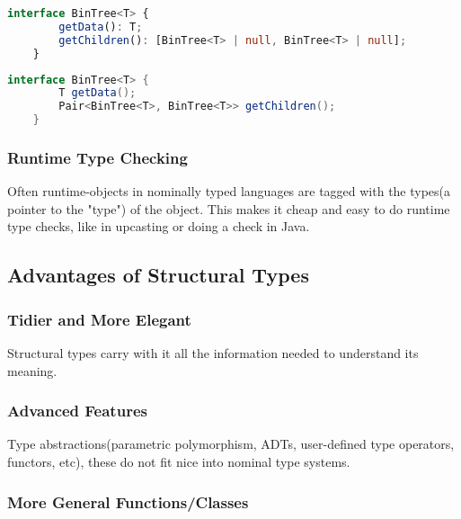 \begin{lstlisting}[label={lst:ts-recursive-type}, language=TypeScript]
    interface BinTree<T> {
        getData(): T;
        getChildren(): [BinTree<T> | null, BinTree<T> | null];
    }
\end{lstlisting}

\begin{lstlisting}[label={lst:java-recursive-type}, language=Java]
    interface BinTree<T> {
        T getData();
        Pair<BinTree<T>, BinTree<T>> getChildren();
    }
\end{lstlisting}

\subsubsection{Runtime Type Checking}\label{subsubsec:runtime-type-checking}

Often runtime-objects in nominally typed languages are tagged with the types(a pointer to the "type") of the object.
This makes it cheap and easy to do runtime type checks, like in upcasting or doing a  check in Java.

\subsection{Advantages of Structural Types}\label{subsec:advantages-of-structural-types}

\subsubsection{Tidier and More Elegant}\label{subsubsec:tidier-and-more-elegant}

Structural types carry with it all the information needed to understand its meaning.

\subsubsection{Advanced Features}\label{subsubsec:advanced-type-features}

Type abstractions(parametric polymorphism, ADTs, user-defined type operators, functors, etc), these do not fit nice into nominal type systems.

\subsubsection{More General Functions/Classes}\label{subsubsec:more-general-functions}


